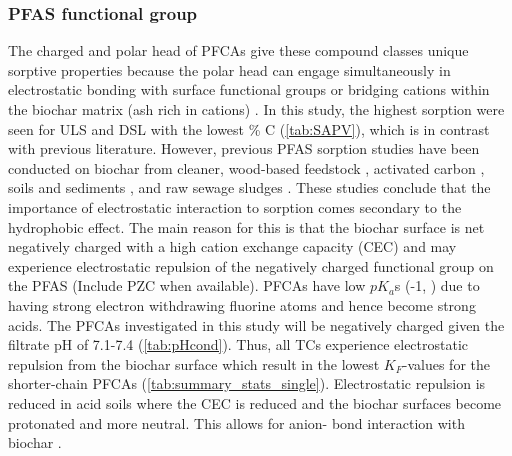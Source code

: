 \subsubsection{PFAS functional group} 
The charged and polar head of PFCAs give these compound classes unique sorptive properties because the polar head can engage simultaneously in electrostatic bonding with surface functional groups or bridging cations within the biochar matrix (ash rich in cations) \citep{zhang2013sorption,sigmund2022sorption}. In this study, the highest sorption were seen for ULS and DSL with the lowest \% C (\cref{tab:SAPV}), which is in contrast with previous literature. However, previous PFAS sorption studies have been conducted on biochar from cleaner, wood-based feedstock \citep{Sormo2021}, activated carbon \citep{zhang2021sorption,Kupryianchyk2016b}, soils and sediments \citep{higgins2006sorption}, and raw sewage sludges \citep{zhang2013sorption}. These studies conclude that the importance of electrostatic interaction to sorption comes secondary to the hydrophobic effect. The main reason for this is that the biochar surface is net negatively charged with a high cation exchange capacity (CEC) \citep{Ahmad2014} and may experience electrostatic repulsion of the negatively charged functional group on the PFAS (Include PZC when available). PFCAs have low $pK_a$s (-1, \citep{goss2008pKa}) due to having strong electron withdrawing fluorine atoms and hence become strong acids. The PFCAs investigated in this study will be negatively charged given the filtrate pH of 7.1-7.4 (\cref{tab:pHcond}). Thus, all TCs experience electrostatic repulsion from the biochar surface which result in the lowest $K_F$-values for the shorter-chain PFCAs (\cref{tab:summary_stats_single}). Electrostatic repulsion is reduced in acid soils where the CEC is reduced and the biochar surfaces become protonated and more neutral. This allows for anion- \textpi bond interaction with biochar \citep{sigmund2022sorption}. 

